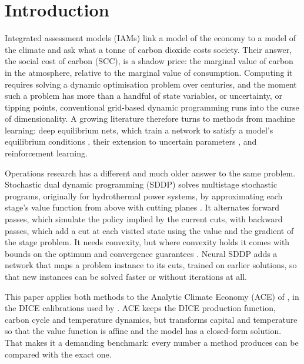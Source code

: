\section{Introduction}
\label{sec:introduction}

Integrated assessment models (IAMs) link a model of the economy to a model of the climate and ask what a tonne of carbon dioxide costs society. Their answer, the social cost of carbon (SCC), is a shadow price: the marginal value of carbon in the atmosphere, relative to the marginal value of consumption. Computing it requires solving a dynamic optimisation problem over centuries, and the moment such a problem has more than a handful of state variables, or uncertainty, or tipping points, conventional grid-based dynamic programming runs into the curse of dimensionality. A growing literature therefore turns to methods from machine learning: deep equilibrium nets, which train a network to satisfy a model's equilibrium conditions \parencite{Azinovic2022DEQN,Maliar2021,Folini2024ClimateInCE}, their extension to uncertain parameters \parencite{friedl2023_deepUQ}, and reinforcement learning.

Operations research has a different and much older answer to the same problem. Stochastic dual dynamic programming (SDDP) \parencite{PereiraPinto1991} solves multistage stochastic programs, originally for hydrothermal power systems, by approximating each stage's value function from above with cutting planes \parencite{Kelley1960,Benders1962}. It alternates forward passes, which simulate the policy implied by the current cuts, with backward passes, which add a cut at each visited state using the value and the gradient of the stage problem. It needs convexity, but where convexity holds it comes with bounds on the optimum and convergence guarantees \parencite{Shapiro2011,Girardeau2015}. Neural SDDP \parencite{Dai2022NeuralSDDP} adds a network that maps a problem instance to its cuts, trained on earlier solutions, so that new instances can be solved faster or without iterations at all.

This paper applies both methods to the Analytic Climate Economy (ACE) of \textcite{TraegerChristian2023ACE}, in the DICE calibrations used by \textcite{traeger2021analytic_discussion}. ACE keeps the DICE production function, carbon cycle and temperature dynamics, but transforms capital and temperature so that the value function is affine and the model has a closed-form solution. That makes it a demanding benchmark: every number a method produces can be compared with the exact one.

